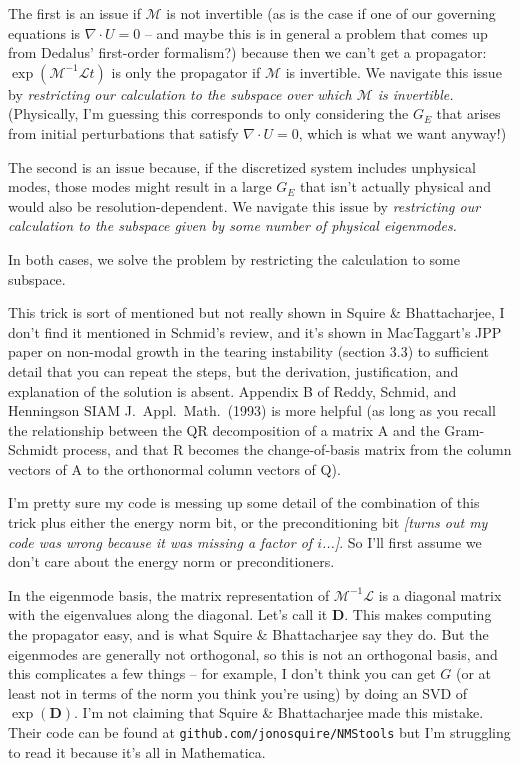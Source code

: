 \documentclass[aps,pop,preprint]{revtex4}
\begin{document}
The first is an issue if $\mathcal{M}$ is not invertible (as is the case if one of our governing equations is $\nabla \cdot U = 0$ -- and maybe this is in general a problem that comes up from Dedalus' first-order formalism?) because then we can't get a propagator: $\exp(\mathcal{M}^{-1} \mathcal{L} t)$ is only the propagator if $\mathcal{M}$ is invertible. 
We navigate this issue by \textit{restricting our calculation to the subspace over which $\mathcal{M}$ is invertible.} 
(Physically, I'm guessing this corresponds to only considering the $G_E$ that arises from initial perturbations that satisfy $\nabla \cdot U = 0$, which is what we want anyway!)

The second is an issue because, if the discretized system includes unphysical modes, those modes might result in a large $G_E$ that isn't actually physical and would also be resolution-dependent. 
We navigate this issue by \textit{restricting our calculation to the subspace given by some number of physical eigenmodes.}

In both cases, we solve the problem by restricting the calculation to some subspace. 

This trick is sort of mentioned but not really shown in Squire \& Bhattacharjee, I don't find it mentioned in Schmid's review, and it's shown in MacTaggart's JPP paper on non-modal growth in the tearing instability (section 3.3) to sufficient detail that you can repeat the steps, but the derivation, justification, and explanation of the solution is absent. 
Appendix B of Reddy, Schmid, and Henningson SIAM J.~Appl.~Math.~(1993) is more helpful (as long as you recall the relationship between the QR decomposition of a matrix A and the Gram-Schmidt process, and that R becomes the change-of-basis matrix from the column vectors of A to the orthonormal column vectors of Q). 

I'm pretty sure my code is messing up some detail of the combination of this trick plus either the energy norm bit, or the preconditioning bit \textit{[turns out my code was wrong because it was missing a factor of $i$...]}. 
So I'll first assume we don't care about the energy norm or preconditioners.

In the eigenmode basis, the matrix representation of $\mathcal{M}^{-1}\mathcal{L}$ is a diagonal matrix with the eigenvalues along the diagonal. 
Let's call it $\mathbf{D}$. 
This makes computing the propagator easy, and is what Squire \& Bhattacharjee say they do. 
But the eigenmodes are generally not orthogonal, so this is not an orthogonal basis, and this complicates a few things -- for example, I don't think you can get $G$ (or at least not in terms of the norm you think you're using) by doing an SVD of $\exp(\mathbf{D})$. 
I'm not claiming that Squire \& Bhattacharjee made this mistake. 
Their code can be found at \texttt{github.com/jonosquire/NMStools} but I'm struggling to read it because it's all in Mathematica.
\end{document}
